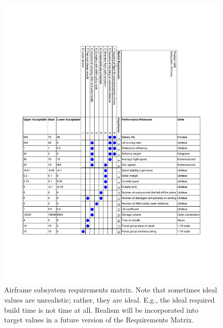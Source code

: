 \documentclass[]{auvsi_doc}
\begin{document}
\begin{AUVSITitlePage}
\begin{artifacttable}
\end{artifacttable}
\end{AUVSITitlePage}

\begin{figure}
	\vspace{-15ex}
		\includegraphics[width=1\textwidth]{figs/RequirementsMatrixAirframe.pdf}
		\caption{ Airframe subsystem requirements matrix. Note that sometimes ideal values are unrealistic; rather, they are ideal. E.g., the ideal required build time is not time at all. Realism will be incorporated into target values in a future version of the Requirements Matrix.}
		\label{fig:reqMat}
\end{figure}
\end{document}
